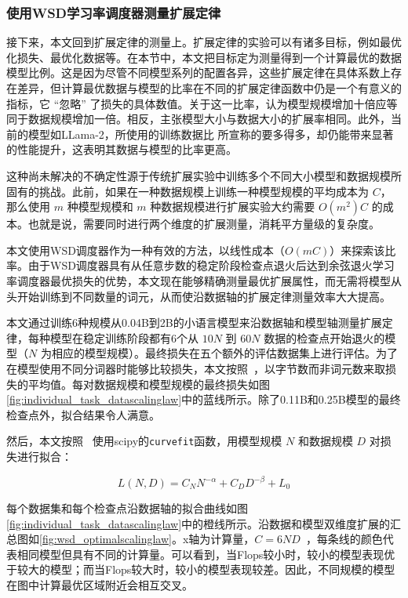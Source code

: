 \subsubsection{使用WSD学习率调度器测量扩展定律}
\label{scalinglawwsdlrs}
接下来，本文回到扩展定律的测量上。扩展定律的实验可以有诸多目标，例如最优化损失、最优化数据等。在本节中，本文把目标定为测量得到一个计算最优的数据模型比例。这是因为尽管不同模型系列的配置各异，这些扩展定律在具体系数上存在差异，但计算最优数据与模型的比率在不同的扩展定律函数中仍是一个有意义的指标，它 “忽略” 了损失的具体数值。关于这一比率，\citet{kaplan2020scaling}认为模型规模增加十倍应等同于数据规模增加一倍。相反，\citet{hoffmann2022training}主张模型大小与数据大小的扩展率相同。此外，当前的模型如LLama-2\cite{touvron2023llama}，所使用的训练数据比 \citet{hoffmann2022training} 所宣称的要多得多，却仍能带来显著的性能提升，这表明其数据与模型的比率更高。

这种尚未解决的不确定性源于传统扩展实验中训练多个不同大小模型和数据规模所固有的挑战。此前，如果在一种数据规模上训练一种模型规模的平均成本为 $C$，那么使用 $m$ 种模型规模和 $m$ 种数据规模进行扩展实验大约需要 $O(m^2)C$ 的成本。也就是说，需要同时进行两个维度的扩展测量，消耗平方量级的复杂度。

本文使用WSD调度器作为一种有效的方法，以线性成本（$O(mC)$）来探索该比率。由于WSD调度器具有从任意步数的稳定阶段检查点退火后达到余弦退火学习率调度器最优损失的优势，本文现在能够精确测量最优扩展属性，而无需将模型从头开始训练到不同数量的词元，从而使沿数据轴的扩展定律测量效率大大提高。

本文通过训练6种规模从0.04B到2B的小语言模型来沿数据轴和模型轴测量扩展定律，每种模型在稳定训练阶段都有6个从 $10N$ 到 $60N$ 数据的检查点开始退火的模型（$N$ 为相应的模型规模）。最终损失在五个额外的评估数据集上进行评估。为了在模型使用不同分词器时能够比较损失，本文按照~\citet{achiam2023gpt}，以字节数而非词元数来取损失的平均值。每对数据规模和模型规模的最终损失如图\ref{fig:individual_task_datascalinglaw}中的蓝线所示。除了0.11B和0.25B模型的最终检查点外，拟合结果令人满意。 

然后，本文按照~\citet{hoffmann2022training} 使用scipy的\texttt{curvefit}函数，用模型规模 $N$ 和数据规模 $D$ 对损失进行拟合：

\begin{equation}
    L(N, D) = C_NN^{-\alpha} + C_DD^{-\beta} + L_0
\label{equ:scalinglaw}
\end{equation}

每个数据集和每个检查点沿数据轴的拟合曲线如图\ref{fig:individual_task_datascalinglaw}中的橙线所示。沿数据和模型双维度扩展的汇总图如\ref{fig:wsd_optimalscalinglaw}。x轴为计算量，$C = 6ND$~\citep{rae2021scaling}，每条线的颜色代表相同模型但具有不同的计算量。可以看到，当Flops较小时，较小的模型表现优于较大的模型；而当Flops较大时，较小的模型表现较差。因此，不同规模的模型在图中计算最优区域附近会相互交叉。


